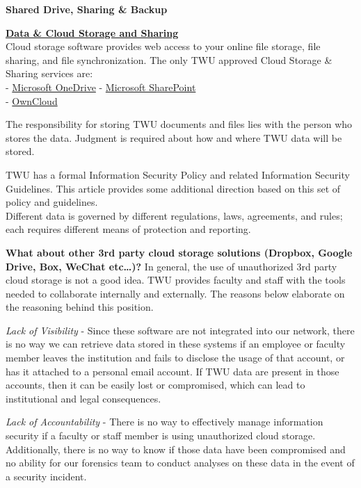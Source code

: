\documentclass[
]{book}
\theoremstyle{definition}
\theoremstyle{definition}
\theoremstyle{definition}
\theoremstyle{definition}
\theoremstyle{remark}
\begin{document}
\textbf{Shared Drive, Sharing \& Backup}

\textbf{\href{https://trinitywestern.teamdynamix.com/TDClient/1904/Portal/KB/ArticleDet?ID=128533}{Data \& Cloud Storage and Sharing}}\\
Cloud storage software provides web access to your online file storage, file sharing, and file synchronization. The only TWU approved Cloud Storage \& Sharing services are:\\
- \href{https://trinitywestern.teamdynamix.com/TDClient/1904/Portal/KB/ArticleDet?ID=71260}{Microsoft OneDrive}
- \href{https://mytwu.sharepoint.com/}{Microsoft SharePoint}\\
- \href{https://trinitywestern.teamdynamix.com/TDClient/1904/Portal/KB/ArticleDet?ID=15681}{OwnCloud}

The responsibility for storing TWU documents and files lies with the person who stores the data. Judgment is required about how and where TWU data will be stored.

TWU has a formal Information Security Policy and related Information Security Guidelines. This article provides some additional direction based on this set of policy and guidelines.\\
Different data is governed by different regulations, laws, agreements, and rules; each requires different means of protection and reporting.

\textbf{What about other 3rd party cloud storage solutions (Dropbox, Google Drive, Box, WeChat etc\ldots)?}
In general, the use of unauthorized 3rd party cloud storage is not a good idea. TWU provides faculty and staff with the tools needed to collaborate internally and externally. The reasons below elaborate on the reasoning behind this position.

\emph{Lack of Visibility} - Since these software are not integrated into our network, there is no way we can retrieve data stored in these systems if an employee or faculty member leaves the institution and fails to disclose the usage of that account, or has it attached to a personal email account. If TWU data are present in those accounts, then it can be easily lost or compromised, which can lead to institutional and legal consequences.

\emph{Lack of Accountability} - There is no way to effectively manage information security if a faculty or staff member is using unauthorized cloud storage. Additionally, there is no way to know if those data have been compromised and no ability for our forensics team to conduct analyses on these data in the event of a security incident.
\end{document}

